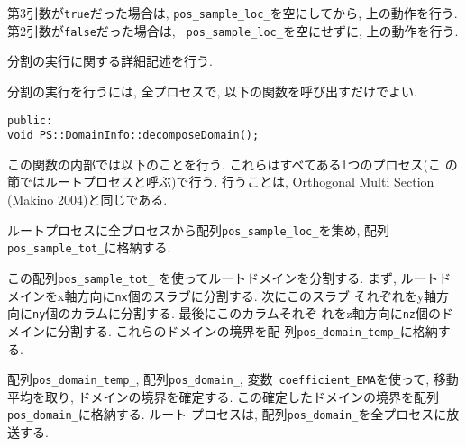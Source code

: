 第3引数が{\tt true}だった場合は, {\tt pos\_sample\_loc\_}を空にしてから,
上の動作を行う. 第2引数が{\tt false}だった場合は, {\tt
pos\_sample\_loc\_}を空にせずに, 上の動作を行う.



分割の実行に関する詳細記述を行う. 

分割の実行を行うには, 全プロセスで, 以下の関数を呼び出すだけでよい.
\begin{screen}
\begin{verbatim}
public:
void PS::DomainInfo::decomposeDomain();
\end{verbatim}
\end{screen}

この関数の内部では以下のことを行う. これらはすべてある1つのプロセス(こ
の節ではルートプロセスと呼ぶ)で行う.  行うことは, Orthogonal Multi
Section (Makino 2004)と同じである.

ルートプロセスに全プロセスから配列{\tt pos\_sample\_loc\_}を集め, 配列
{\tt pos\_sample\_tot\_}に格納する. 

この配列{\tt pos\_sample\_tot\_} を使ってルートドメインを分割する. まず,
ルートドメインをx軸方向に{\tt nx}個のスラブに分割する.  次にこのスラブ
それぞれをy軸方向に{\tt ny}個のカラムに分割する. 最後にこのカラムそれぞ
れをz軸方向に{\tt nz}個のドメインに分割する. これらのドメインの境界を配
列{\tt pos\_domain\_temp\_}に格納する.

配列{\tt pos\_domain\_temp\_}, 配列{\tt pos\_domain\_}, 変数{\tt
coefficient\_EMA}を使って, 移動平均を取り, ドメインの境界を確定する.
この確定したドメインの境界を配列{\tt pos\_domain\_}に格納する. ルート
プロセスは, 配列{\tt pos\_domain\_}を全プロセスに放送する.




